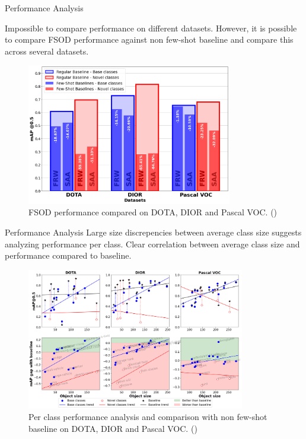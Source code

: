 \begin{subsectionframemod}{Performance Analysis}
    
    
    Impossible to compare performance on different datasets. However, it is
    possible to \alert{compare FSOD performance against non few-shot baseline} and
    compare this across several datasets.

    \begin{figure}
        \includegraphics[width=0.8\textwidth]{Figures/dataset_comparison.png}
        \caption{FSOD performance compared on DOTA, DIOR and Pascal VOC. (\cite{lejeune2022improving})}
    \end{figure}

\end{subsectionframemod}

\begin{subsectionframemod}{Performance Analysis}
    Large size discrepencies between average class size suggests analyzing performance
    per class. \alert{Clear correlation between average class size and performance} compared to baseline. 
    \begin{figure}
        \includegraphics[width=0.85\textwidth]{Figures/performance_comparison.png}
        \caption{Per class performance analysis and comparison with non few-shot baseline on DOTA, DIOR and Pascal VOC. (\cite{lejeune2022improving})}
    \end{figure}

\end{subsectionframemod}
